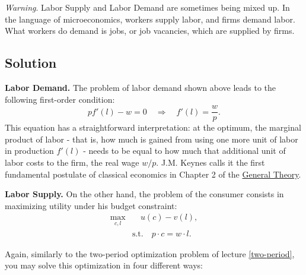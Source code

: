 \documentclass[]{book}
\theoremstyle{definition}
\theoremstyle{definition}
\theoremstyle{definition}
\theoremstyle{remark}
\begin{document}
\emph{Warning}. Labor Supply and Labor Demand are sometimes being mixed
up. In the language of microeconomics, workers supply labor, and firms
demand labor. What workers do demand is jobs, or job vacancies, which
are supplied by firms.

\subsection{Solution}\label{solution-2}

\textbf{Labor Demand.} The problem of labor demand shown above leads to
the following first-order condition:
\[pf'(l)-w = 0 \quad \Rightarrow \quad f'(l)=\frac{w}{p}.\] This
equation has a straightforward interpretation: at the optimum, the
marginal product of labor - that is, how much is gained from using one
more unit of labor in production \(f'(l)\) - needs to be equal to how
much that additional unit of labor costs to the firm, the real wage
\(w/p\). J.M. Keynes calls it the first fundamental postulate of
classical economics in Chapter 2 of the
\href{http://cas2.umkc.edu/economics/people/facultypages/kregel/courses/econ645/winter2011/generaltheory.pdf}{General
Theory}.

\textbf{Labor Supply.} On the other hand, the problem of the consumer
consists in maximizing utility under his budget constraint: \[
\begin{aligned}
\max_{c,l}& \quad u(c)-v(l),\\
&\text{s.t.}\quad p \cdot c = w \cdot l.
\end{aligned}
\]

Again, similarly to the two-period optimization problem of lecture
\ref{two-period}, you may solve this optimization in four different
ways:
\end{document}

